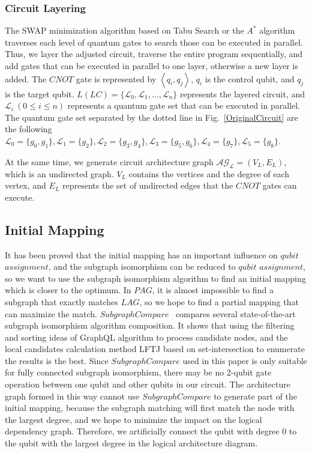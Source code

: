 \documentclass[runningheads]{llncs}
\begin{document}
\subsubsection{Circuit Layering}
The SWAP minimization algorithm based on Tabu Search or the $A^{*}$ algorithm 
traverses each level of quantum gates to search those can be executed in parallel.
Thus, we layer the adjusted circuit, 
traverse the entire program sequentially, 
and add gates that can be executed in parallel to one layer, 
otherwise a new layer is added. 
The $CNOT$ gate is represented by $\left \langle  q_{i}, q_{j} \right \rangle $, $q_{i}$ is the control qubit, 
and $q_{j}$ is the target qubit.
$L(LC)=\{\mathcal{L}_{0},\mathcal{L}_{1},...,\mathcal{L}_{n}\}$ represents the layered circuit, and
$\mathcal{L}_{i} \ (0 \le i \le n) $ represents a quantum gate set that can be executed in parallel.
The quantum gate set separated by the dotted line in Fig.~\ref{OriginalCircuit} are the following
 $\mathcal{L}_{0}=\{g_{0},g_{1}\},\mathcal{L}_{1}=\{g_{2}\},
 \mathcal{L}_{2}=\{g_{3},g_{4}\},\mathcal{L}_{3}=\{g_{5},g_{6}\},\mathcal{L}_{4}=\{g_{7}\},\mathcal{L}_{5}=\{g_{8}\}$.

At the same time, we generate circuit architecture graph $\mathcal{AG_{L}}=(V_{L},E_{L})$,
 which is an undirected graph. $V_{L}$ contains the vertices and the degree of each vertex, 
and $E_{L}$ represents the set of undirected edges that the $CNOT$ gates can execute.
\subsection{Initial Mapping}
It has been proved that the initial mapping has an important influence on $qubit$  
$ assignment$, 
and the subgraph isomorphism can be reduced to $qubit$ $ assignment$, so we want to use the subgraph 
isomorphism algorithm to find an initial mapping which is closer to the optimum.
In $PAG$, it is almost impossible to find a subgraph that exactly 
matches $LAG$, so we hope to find a partial mapping that can maximize the match. 
$SubgraphCompare$~\cite{Sun2020} compares several state-of-the-art subgraph isomorphism algorithm composition. 
It shows that using the filtering and sorting ideas of GraphQL algorithm to process 
candidate nodes, and the local candidates calculation method LFTJ based on 
set-intersection to enumerate the results is the best.
Since $SubgraphCompare$ used in this paper is only suitable for 
fully connected subgraph isomorphism, 
there may be no 2-qubit gate operation between one qubit and other qubits in our circuit.
 The architecture graph formed in this way cannot use $SubgraphCompare$ 
to generate part of the initial mapping, 
 because the subgraph matching will first match the node with the largest degree, 
 and we hope to minimize the impact on the logical dependency graph. 
 Therefore, we artificially connect the qubit with degree 0 to the qubit with 
 the largest degree in the logical architecture diagram.
\end{document}
